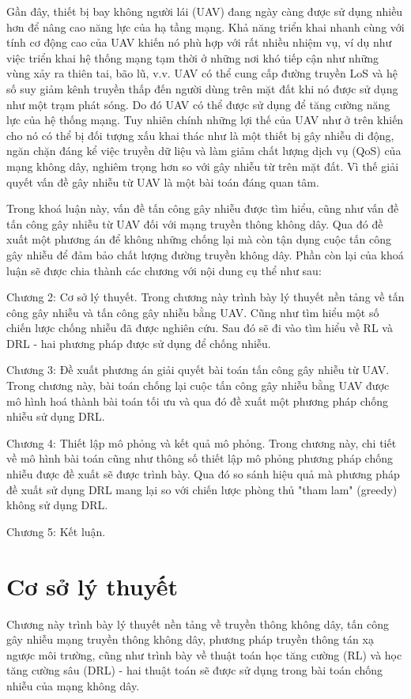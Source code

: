 \documentclass{uetgraduation}
\begin{document}
Gần đây, thiết bị bay không người lái (UAV) đang ngày càng được sử dụng nhiều hơn để nâng cao năng lực của hạ tầng mạng. Khả năng
triển khai nhanh cùng với tính cơ động cao của UAV khiến nó phù hợp với rất nhiều nhiệm vụ, ví dụ như việc triển khai hệ thống
mạng tạm thời ở những nơi khó tiếp cận như những vùng xảy ra thiên tai, bão lũ, v.v. UAV có thể cung cấp đường truyền LoS và hệ số suy
giảm kênh truyền thấp đến người dùng trên mặt đất khi nó được sử dụng như một trạm phát sóng. Do đó UAV có thể được sử dụng để
tăng cường năng lực của hệ thống mạng. Tuy nhiên chính những lợi thế của UAV như ở trên khiến cho nó có thể bị đối tượng xấu 
khai thác như là một thiết bị gây nhiễu di động, ngăn chặn đáng kể việc truyền dữ liệu và làm giảm chất lượng dịch vụ (QoS) của mạng
không dây, nghiêm trọng hơn so với gây nhiễu từ trên mặt đất. Vì thế giải quyết vấn đề gây nhiễu từ UAV là một bài toán đáng quan tâm.

Trong khoá luận này, vấn đề tấn công gây nhiễu được tìm hiểu, cũng như vấn đề tấn công gây nhiễu từ UAV đối với mạng truyền thông không dây.
Qua đó đề xuất một phương án để không những chống lại mà còn tận dụng cuộc tấn công gây nhiễu để đảm bảo chất lượng đường truyền không dây.
Phần còn lại của khoá luận sẽ được chia thành các chương với nội dung cụ thể như sau:

Chương 2: Cơ sở lý thuyết. Trong chương này trình bày lý thuyết nền tảng về tấn công gây nhiễu và tấn công gây nhiễu bằng UAV.
Cũng như tìm hiểu một số chiến lược chống nhiễu đã được nghiên cứu. Sau đó sẽ đi vào tìm hiểu về RL và DRL - hai phương pháp được
sử dụng để chống nhiễu.

Chương 3: Đề xuất phương án giải quyết bài toán tấn công gây nhiễu từ UAV. Trong chương này, bài toán chống lại cuộc tấn công
gây nhiễu bằng UAV được mô hình hoá thành bài toán tối ưu và qua đó đề xuất một phương pháp chống nhiễu sử dụng DRL.

Chương 4: Thiết lập mô phỏng và kết quả mô phỏng. Trong chương này, chi tiết về mô hình bài toán cũng như thông số thiết lập mô
phỏng phương pháp chống nhiễu được đề xuất sẽ được trình bày. Qua đó so sánh hiệu quả mà phương pháp đề xuất sử dụng DRL mang lại so với chiến lược phòng thủ 
"tham lam" (greedy) không sử dụng DRL.

Chương 5: Kết luận.

\chapter{Cơ sở lý thuyết}
Chương này trình bày lý thuyết nền tảng về truyền thông không dây, tấn công gây nhiễu mạng truyền thông không dây, phương pháp truyền thông tán xạ ngược môi trường,
cũng như trình bày về thuật toán học tăng cường (RL) và học tăng cường sâu (DRL) - hai thuật toán sẽ được sử dụng trong bài toán chống nhiễu của mạng không dây.
\end{document}
